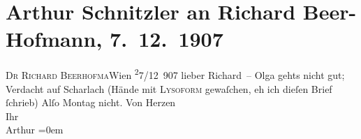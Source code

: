 

         
         \renewcommand{\erwaehntePersonen}{Personen: Richard Beer-Hofmann, Olga Schnitzler}
         \renewcommand{\erwaehnteOrte}{Orte: Wien}
         \renewcommand{\erwaehnteWerke}{}
               \section[Arthur Schnitzler an Richard Beer-Hofmann, 7. 12. 1907]{ Arthur Schnitzler an Richard Beer-Hofmann, 7. 12. 1907}\nopagebreak{}\rehead{ }\begin{ledgroupsized}[t]{13cm}\normalsize\beginnumbering \toendnotes[C]{\smallbreak\pagebreak[2]} 
\pstart{}{\pb}\textsc{Dr Richard Beerhofma{\geminationn}}\pend{}\pstart{}Wien\pend{}{\bigskip}\pstart
           \raggedleft{}{\pb}\substVorne{}\textsuperscript{2}\substDazwischen{}7\substHinten{}/12 907\pend
           \pstart{}lieber Richard –\pend\pstart
           Olga gehts nicht gut; Verdacht auf Scharlach
               (Hände mit \textsc{Lysoform} gewaſchen, eh ich dieſen Brief
               ſchrieb)\pend
           \pstart
           Alſo Montag nicht.\pend
           \pstart
           Von Herzen{\\[\baselineskip]}Ihr{\\[\baselineskip]}\spacefill\mbox{Arthur}\pend
           \leftskip=0em{}
         
         \endnumbering{}\end{ledgroupsized}  \newcommand{\dateiname}{L01738}\newcommand{\titel}{Arthur Schnitzler an Richard Beer-Hofmann, 7. 12. 1907}\newcommand{\editorInnen}{Martin Anton Müller und Gerd-Hermann Susen}
      